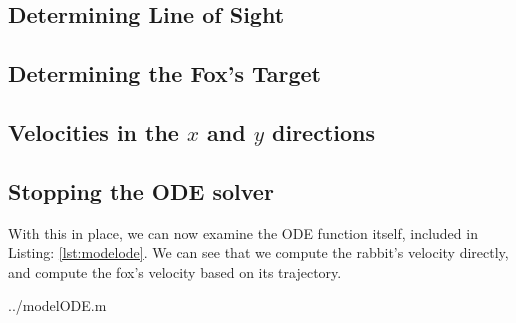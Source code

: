 \subsection{Determining Line of Sight}



\subsection {Determining the Fox's Target}



\subsection {Velocities in the $x$ and $y$ directions}



\subsection {Stopping the ODE solver}



With this in place, we can now examine the ODE function itself, included in Listing: \ref{lst:modelode}. We can see that we compute the rabbit's velocity directly, and compute the fox's velocity based on its trajectory.

  {../modelODE.m}





